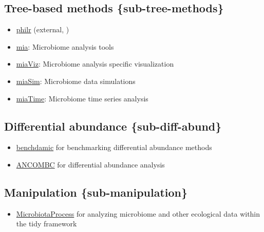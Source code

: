 \documentclass[
]{book}
\providecommand{\tightlist}{%
  \setlength{\itemsep}{0pt}\setlength{\parskip}{0pt}}
\begin{document}
\hypertarget{tree-based-methods-sub-tree-methods}{%
\subsection{Tree-based methods \{sub-tree-methods\}}\label{tree-based-methods-sub-tree-methods}}

\begin{itemize}
\tightlist
\item
  \href{http://bioconductor.org/packages/devel/bioc/html/philr.html}{philr} (external, \citet{Silverman2017})
\item
  \href{microbiome.github.io/mia}{mia}: Microbiome analysis tools \citep{R-mia}
\item
  \href{microbiome.github.io/miaViz}{miaViz}: Microbiome analysis specific visualization \citep{Ernst2022}
\item
  \href{microbiome.github.io/miaSim}{miaSim}: Microbiome data simulations \citep{Simsek2021}
\item
  \href{microbiome.github.io/miaTime}{miaTime}: Microbiome time series analysis \citep{Lahti2021}
\end{itemize}

\hypertarget{differential-abundance-sub-diff-abund}{%
\subsection{Differential abundance \{sub-diff-abund\}}\label{differential-abundance-sub-diff-abund}}

\begin{itemize}
\tightlist
\item
  \href{https://bioconductor.org/packages/release/bioc/vignettes/benchdamic/inst/doc/intro.html}{benchdamic} for benchmarking differential abundance methods
\item
  \href{https://bioconductor.org/packages/devel/bioc/html/ANCOMBC.html}{ANCOMBC} for differential abundance analysis
\end{itemize}

\hypertarget{manipulation-sub-manipulation}{%
\subsection{Manipulation \{sub-manipulation\}}\label{manipulation-sub-manipulation}}

\begin{itemize}
\tightlist
\item
  \href{https://bioconductor.org/packages/release/bioc/html/MicrobiotaProcess.html}{MicrobiotaProcess} for analyzing microbiome and other ecological data within the tidy framework
\end{itemize}
\end{document}
